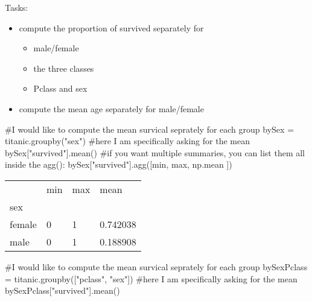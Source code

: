 \documentclass[
  letterpaper,
  DIV=11,
  numbers=noendperiod]{scrreprt}
\newenvironment{Shaded}{\begin{snugshade}}{\end{snugshade}}
\newcommand{\BuiltInTok}[1]{\textcolor[rgb]{0.00,0.23,0.31}{#1}}
\newcommand{\CommentTok}[1]{\textcolor[rgb]{0.37,0.37,0.37}{#1}}
\newcommand{\NormalTok}[1]{\textcolor[rgb]{0.00,0.23,0.31}{#1}}
\newcommand{\OperatorTok}[1]{\textcolor[rgb]{0.37,0.37,0.37}{#1}}
\newcommand{\StringTok}[1]{\textcolor[rgb]{0.13,0.47,0.30}{#1}}
\providecommand{\tightlist}{%
  \setlength{\itemsep}{0pt}\setlength{\parskip}{0pt}}\usepackage{longtable,booktabs,array}
\begin{document}
Tasks:

\begin{itemize}
\tightlist
\item
  compute the proportion of survived separately for

  \begin{itemize}
  \tightlist
  \item
    male/female
  \item
    the three classes
  \item
    Pclass and sex
  \end{itemize}
\item
  compute the mean age separately for male/female
\end{itemize}

\begin{Shaded}
\begin{Highlighting}[]
\CommentTok{\#I would like to compute the mean survical seprately for each group}
\NormalTok{bySex }\OperatorTok{=}\NormalTok{ titanic.groupby(}\StringTok{"sex"}\NormalTok{)}
\CommentTok{\#here I am specifically asking for the mean}
\NormalTok{bySex[}\StringTok{"survived"}\NormalTok{].mean()}
\CommentTok{\#if you want multiple summaries, you can list them all inside the agg():}
\NormalTok{bySex[}\StringTok{"survived"}\NormalTok{].agg([}\BuiltInTok{min}\NormalTok{, }\BuiltInTok{max}\NormalTok{, np.mean ])}
\end{Highlighting}
\end{Shaded}

\begin{longtable}[]{@{}llll@{}}
\toprule()
& min & max & mean \\
sex & & & \\
\midrule()
\endhead
female & 0 & 1 & 0.742038 \\
male & 0 & 1 & 0.188908 \\
\bottomrule()
\end{longtable}

\begin{Shaded}
\begin{Highlighting}[]
\CommentTok{\#I would like to compute the mean survical seprately for each group}
\NormalTok{bySexPclass }\OperatorTok{=}\NormalTok{ titanic.groupby([}\StringTok{"pclass"}\NormalTok{, }\StringTok{"sex"}\NormalTok{])}
\CommentTok{\#here I am specifically asking for the mean}
\NormalTok{bySexPclass[}\StringTok{"survived"}\NormalTok{].mean()}
\end{Highlighting}
\end{Shaded}
\end{document}
